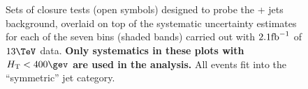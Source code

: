 \clearpage
\begin{figure}[h!]
  \begin{center}
     ~~
     \\
     ~~
     \\
    \caption{Sets of closure tests (open symbols) designed to probe
      the \znunu + jets background, overlaid on top of
      the systematic uncertainty estimates for each of the seven
      \scalht bins (shaded bands) carried out with $2.1\ifb$ of
      $13\tev$ data. {\bf Only systematics in these plots with
      $\scalht<400\gev$ are used in the analysis.} All events fit 
      into the ``symmetric'' jet
      category.}
    \label{fig:ZinvclosureDataSymlt400}
  \end{center} 
\end{figure}

